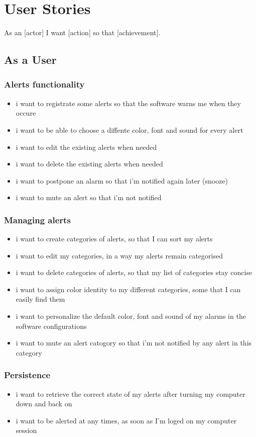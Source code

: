 \section{User Stories}
As an [actor] I want [action] so that [achievement].

\subsection{As a User}
\subsubsection{Alerts functionality}
\begin{itemize}
	\item i want to registrate some alerts so that the software warns me when they occure
	\item i want to be able to choose a diffente color, font and sound for every alert
	\item i want to edit the existing alerts when needed
	\item i want to delete the existing alerts when needed
	\item i want to postpone an alarm so that i'm notified again later (snooze)
	\item i want to mute an alert so that i'm not notified
\end{itemize}
\subsubsection{Managing alerts}
\begin{itemize}
	\item i want to create categories of alerts, so that I can sort my alerts
	\item i want to edit my categories, in a way my alerts remain categorised
	\item i want to delete categories of alerts, so that my list of categories stay concise
	\item i want to assign color identity to my different categories, some that I can easily find them
	\item i want to personalize the default color, font and sound of my alarms in the software configurations
	\item i want to mute an alert catogory so that i'm not notified by any alert in this category
\end{itemize}
\subsubsection{Persistence}
\begin{itemize}
	\item i want to retrieve the correct state of my alerts after turning my computer down and back on
	\item i want to be alerted at any times, as soon as I'm loged on my computer session
\end{itemize}
